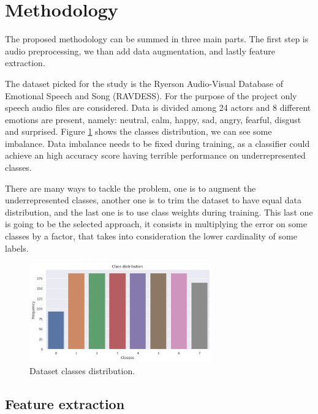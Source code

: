 \section{Methodology}

The proposed methodology can be summed in three main parts. 
The first step is audio preprocessing, we than add data augmentation, 
and lastly feature extraction.

The dataset picked for the study is the Ryerson Audio-Visual Database of Emotional Speech
and Song (RAVDESS). For the purpose of the project only speech audio files are 
considered.
Data is divided among 24 actors and 8 different emotions are present, namely: 
neutral, calm, happy, sad, angry, fearful, disgust and surprised.
Figure \ref{fig:classes} shows the classes distribution, we can see some imbalance. 
Data imbalance needs to be fixed during training, as a classifier could achieve an high accuracy 
score having terrible performance on underrepresented classes. 

There are many ways to tackle the problem, one is to augment the underrepresented classes, another 
one is to trim the dataset to have equal data distribution, and the last one is to use class weights 
during training. This last one is going to be the selected approach, it consists in multiplying 
the error on some classes by a factor, that takes into consideration the lower cardinality of 
some labels.  


\begin{figure}
  \begin{center}
      \includegraphics[width=0.7\textwidth]{images/classes.png}
      \caption{Dataset classes distribution.} \label{fig:classes}
  \end{center}
\end{figure}

\subsection{Feature extraction}

